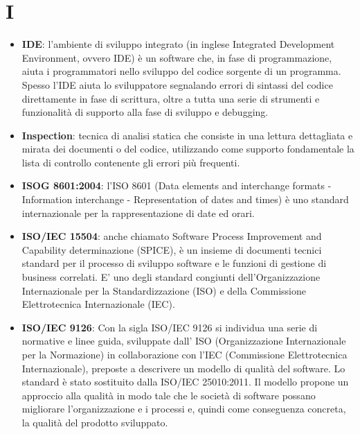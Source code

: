 \section{I}
\begin{itemize} 
	\item
	\textbf{IDE}: l’ambiente di sviluppo integrato (in inglese Integrated Development Environment, ovvero IDE) è un software che, in fase di programmazione, aiuta i programmatori nello sviluppo del codice sorgente di un programma. Spesso l’IDE aiuta lo sviluppatore segnalando errori di sintassi del codice direttamente in fase di scrittura, oltre a tutta una serie di strumenti e funzionalità di supporto alla fase di sviluppo e debugging.
	\item
	\textbf{Inspection}: tecnica di analisi statica che consiste in una lettura dettagliata e mirata dei documenti o del codice, utilizzando come supporto fondamentale la lista di controllo contenente gli errori più frequenti.
	\item
	\textbf{ISOG 8601:2004}: l'ISO 8601 (Data elements and interchange formats - Information interchange - Representation of dates and times) è uno standard internazionale per la rappresentazione di date ed orari.
	\item
	\textbf{ISO/IEC 15504}: anche chiamato Software Process Improvement and Capability determinazione (SPICE), è un insieme di documenti tecnici standard per il processo di sviluppo software e le funzioni di gestione di business correlati. E' uno degli standard congiunti dell'Organizzazione Internazionale per la Standardizzazione (ISO) e della Commissione Elettrotecnica Internazionale (IEC).
	\item
	\textbf{ISO/IEC 9126}: Con la sigla ISO/IEC 9126 si individua una serie di normative e linee guida, sviluppate dall’ ISO (Organizzazione Internazionale per la Normazione) in collaborazione con l'IEC (Commissione Elettrotecnica Internazionale), preposte a descrivere un modello di qualità del software. Lo standard è stato sostituito dalla ISO/IEC 25010:2011. Il modello propone un approccio alla qualità in modo tale che le società di software possano migliorare l'organizzazione e i processi e, quindi come conseguenza concreta, la qualità del prodotto sviluppato.
\end{itemize}